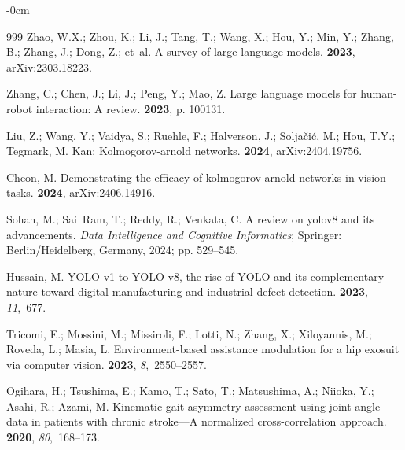 \documentclass[actuators,article,accept,pdftex,moreauthors]{Definitions/mdpi}
\begin{document}
\begin{adjustwidth}{-\extralength}{0cm}
\begin{thebibliography}{999}
Zhao, W.X.; Zhou, K.; Li, J.; Tang, T.; Wang, X.; Hou, Y.; Min, Y.; Zhang, B.;
  Zhang, J.; Dong, Z.;  et~al.
\newblock A survey of large language models.
  {\bf 2023}, arXiv:2303.18223.

Zhang, C.; Chen, J.; Li, J.; Peng, Y.; Mao, Z.
\newblock Large language models for human-robot interaction: A review.
 {\bf 2023}, p. 100131.

Liu, Z.; Wang, Y.; Vaidya, S.; Ruehle, F.; Halverson, J.; Solja{\v{c}}i{\'c},
  M.; Hou, T.Y.; Tegmark, M.
\newblock Kan: Kolmogorov-arnold networks.
  {\bf 2024},  arXiv:2404.19756.

Cheon, M.
\newblock Demonstrating the efficacy of kolmogorov-arnold networks in vision
  tasks.
 {\bf 2024},  arXiv:2406.14916.

Sohan, M.; Sai~Ram, T.; Reddy, R.; Venkata, C.
\newblock A review on yolov8 and its advancements.
 \emph{{Data Intelligence and Cognitive Informatics}}; %
 Springer: {Berlin/Heidelberg, Germany,} %
  2024; pp. 529--545.

Hussain, M.
\newblock YOLO-v1 to YOLO-v8, the rise of YOLO and its complementary nature
  toward digital manufacturing and industrial defect detection.
 {\bf 2023}, {\em 11},~677.

Tricomi, E.; Mossini, M.; Missiroli, F.; Lotti, N.; Zhang, X.; Xiloyannis, M.;
  Roveda, L.; Masia, L.
\newblock Environment-based assistance modulation for a hip exosuit via
  computer vision.
 {\bf 2023}, {\em
  8},~2550--2557.

Ogihara, H.; Tsushima, E.; Kamo, T.; Sato, T.; Matsushima, A.; Niioka, Y.;
  Asahi, R.; Azami, M.
\newblock Kinematic gait asymmetry assessment using joint angle data in
  patients with chronic stroke—A normalized cross-correlation approach.
 {\bf 2020}, {\em 80},~168--173.


\end{thebibliography}
\end{adjustwidth}
\end{document}
